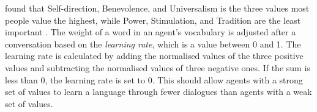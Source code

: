 \citeauthor{schwartz1992unniversals} found that Self-direction, Benevolence, and Universalism is the three values most people value the highest, while Power, Stimulation, and Tradition are the least important \citep{schwartz1992unniversals}. The weight of a word in an agent's vocabulary is adjusted after a conversation based on the \textit{learning rate}, which is a value between 0 and 1. The learning rate is calculated by adding the normalised values of the three positive values and subtracting the normalised values of three negative ones. If the sum is less than 0, the learning rate is set to 0. This should allow agents with a strong set of values to learn a language through fewer dialogues than agents with a weak set of values. 

